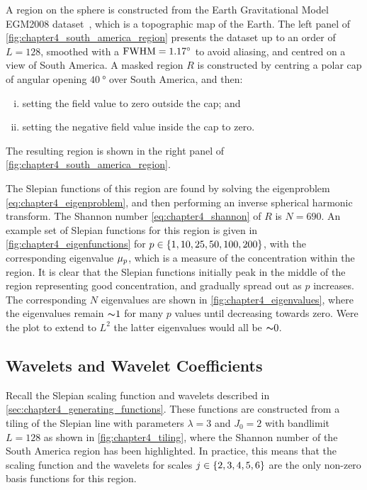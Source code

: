 A region on the sphere is constructed from the Earth Gravitational Model EGM2008 dataset~\cite{Pavlis2013}, which is a topographic map of the Earth.
The left panel of \cref{fig:chapter4_south_america_region} presents the dataset up to an order of \(L=128\), smoothed with a \(\text{FWHM}=\SI{1.17}{\degree}\) to avoid aliasing, and centred on a view of South America.
A masked region \(R\) is constructed by centring a polar cap of angular opening \(\SI{40}{\degree}\) over South America, and then:
%
\begin{enumerate}[(i),nosep,left=\parindent]
	\item setting the field value to zero outside the cap; and
	\item setting the negative field value inside the cap to zero.
\end{enumerate}
%
The resulting region is shown in the right panel of \cref{fig:chapter4_south_america_region}.



The Slepian functions of this region are found by solving the eigenproblem \cref{eq:chapter4_eigenproblem}, and then performing an inverse spherical harmonic transform.
The Shannon number \cref{eq:chapter4_shannon} of \(R\) is \(N=690\).
An example set of Slepian functions for this region is given in \cref{fig:chapter4_eigenfunctions} for \(p \in \{1, 10, 25, 50, 100, 200\}\), with the corresponding eigenvalue \({\mu}_{p}\), which is a measure of the concentration within the region.
It is clear that the Slepian functions initially peak in the middle of the region representing good concentration, and gradually spread out as \(p\) increases.
The corresponding \(N\) eigenvalues are shown in \cref{fig:chapter4_eigenvalues}, where the eigenvalues remain \({\thicksim}1\) for many \(p\) values until decreasing towards zero.
Were the plot to extend to \(L^{2}\) the latter eigenvalues would all be \({\thicksim}0\).





\subsection{Wavelets and Wavelet Coefficients}\label{sec:chapter4_south_america_wavelets}

Recall the Slepian scaling function and wavelets described in \cref{sec:chapter4_generating_functions}.
These functions are constructed from a tiling of the Slepian line with parameters \(\lambda=3\) and \(J_{0}=2\) with bandlimit \(L=128\) as shown in \cref{fig:chapter4_tiling}, where the Shannon number of the South America region has been highlighted.
In practice, this means that the scaling function and the wavelets for scales \(j \in \{2, 3, 4, 5, 6\}\) are the only non-zero basis functions for this region.

